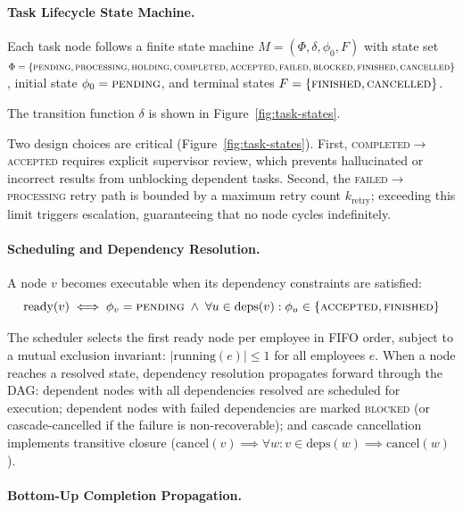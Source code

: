 \documentclass[11pt,a4paper]{article}
\begin{document}
\paragraph{Task Lifecycle State Machine.} Each task node follows a finite state machine $M = (\Phi, \delta, \phi_0, F)$ with state set $\Phi = \{\textsc{pending}, \textsc{processing}, \textsc{holding}, \textsc{completed}, \textsc{accepted}, \textsc{failed}, \textsc{blocked}, \textsc{finished}, \textsc{cancelled}\}$, initial state $\phi_0 = \textsc{pending}$, and terminal states $F = \{\textsc{finished}, \textsc{cancelled}\}$.

The transition function $\delta$ is shown in Figure~\ref{fig:task-states}.



Two design choices are critical (Figure~\ref{fig:task-states}). First, \textsc{completed}$\to$\textsc{accepted} requires explicit supervisor review, which prevents hallucinated or incorrect results from unblocking dependent tasks. Second, the \textsc{failed}$\to$\textsc{processing} retry path is bounded by a maximum retry count $k_{\text{retry}}$; exceeding this limit triggers escalation, guaranteeing that no node cycles indefinitely.

\paragraph{Scheduling and Dependency Resolution.} A node $v$ becomes executable when its dependency constraints are satisfied:
\begin{equation}
\text{ready}(v) \iff \phi_v = \textsc{pending} \;\wedge\; \forall u \in \text{deps}(v) : \phi_u \in \{\textsc{accepted}, \textsc{finished}\}
\end{equation}

The scheduler selects the first ready node per employee in FIFO order, subject to a mutual exclusion invariant: $|\text{running}(e)| \leq 1$ for all employees $e$.  When a node reaches a resolved state, dependency resolution propagates forward through the DAG: dependent nodes with all dependencies resolved are scheduled for execution; dependent nodes with failed dependencies are marked \textsc{blocked} (or cascade-cancelled if the failure is non-recoverable); and cascade cancellation implements transitive closure ($\text{cancel}(v) \implies \forall w : v \in \text{deps}(w) \implies \text{cancel}(w)$).

\paragraph{Bottom-Up Completion Propagation.}
\end{document}
